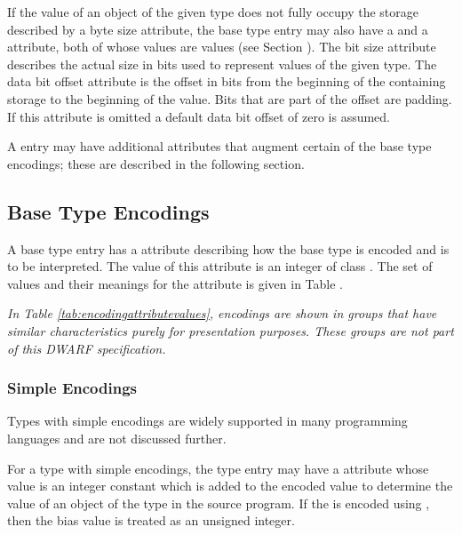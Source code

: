 {If the value of an object of the given type does not fully
occupy the storage described by a byte size 
attribute,\hypertarget{chap:DWATdatabitoffsetbasetypebitlocation}{}
the base type entry may also have a 
\DWATbitsizeDEFN{} and a \DWATdatabitoffsetDEFN{} attribute,
both of whose values are
 values
(see Section ). 
The bit size
attribute describes the actual size in bits used to represent
values of the given type. The data bit offset attribute is the
offset in bits from the beginning of the containing storage to
the beginning of the value. Bits that are part of the offset
are padding. 
If this attribute is omitted a default data bit offset
of zero is assumed.

A \DWTAGbasetype{} entry may have additional attributes that
augment certain of the base type encodings; these are described
in the following section.

\subsection{Base Type Encodings}
\label{chap:basetypeencodings}
A base type entry has 
a \DWATencoding{} attribute describing
how the base type is encoded and is to be interpreted. The 
value of this attribute is an integer of class \CLASSconstant.
The set of values and their meanings for the
\DWATencoding{} attribute is given in 
Table .

\textit{In Table \ref{tab:encodingattributevalues}, encodings
are shown in groups that have similar characteristics purely
for presentation purposes. These groups are not part of this
DWARF specification.}

\subsubsection{Simple Encodings}
\label{chap:simpleencodings}
Types with simple encodings are widely supported in many
programming languages and are not discussed further.

\label{chap:DWATbiassimpleencodingbias}
\bb
For a type with simple encodings, the type entry may have a \DWATbias{} attribute
whose value is an integer constant which is added to the encoded value to
determine the value of an object of the type in the source program. 
If the \DWATbias{} is encoded using \DWFORMdatan{}, then the bias value
is treated as an unsigned integer.
\eb


}
